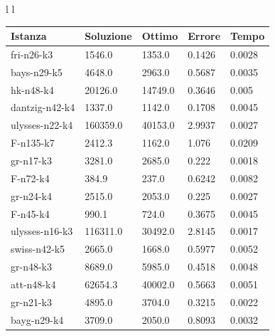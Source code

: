 \documentclass[]{article}
\begin{document}
\begin{tabular}{l l}
	\small	
	\begin{tabular}{||l | l l l l||} 
		\hline
		Istanza & Soluzione & Ottimo & Errore & Tempo \\ [0.5ex] 
		\hline\hline
		fri-n26-k3 & 1546.0 & 1353.0 & 0.1426 & 0.0028  \\
		bays-n29-k5 & 4648.0 & 2963.0 & 0.5687 & 0.0035  \\
		hk-n48-k4 & 20126.0 & 14749.0 & 0.3646 & 0.005  \\
		dantzig-n42-k4 & 1337.0 & 1142.0 & 0.1708 & 0.0045  \\
		ulysses-n22-k4 & 160359.0 & 40153.0 & 2.9937 & 0.0027  \\
		F-n135-k7 & 2412.3 & 1162.0 & 1.076 & 0.0209  \\
		gr-n17-k3 & 3281.0 & 2685.0 & 0.222 & 0.0018  \\
		F-n72-k4 & 384.9 & 237.0 & 0.6242 & 0.0082  \\
		gr-n24-k4 & 2515.0 & 2053.0 & 0.225 & 0.0027  \\
		F-n45-k4 & 990.1 & 724.0 & 0.3675 & 0.0045  \\
		ulysses-n16-k3 & 116311.0 & 30492.0 & 2.8145 & 0.0017  \\
		swiss-n42-k5 & 2665.0 & 1668.0 & 0.5977 & 0.0052  \\
		gr-n48-k3 & 8689.0 & 5985.0 & 0.4518 & 0.0048  \\
		att-n48-k4 & 62654.3 & 40002.0 & 0.5663 & 0.0051  \\
		gr-n21-k3 & 4895.0 & 3704.0 & 0.3215 & 0.0022  \\
		bayg-n29-k4 & 3709.0 & 2050.0 & 0.8093 & 0.0032  \\				
		[1ex] 
		\hline
	\end{tabular}
	

\end{tabular}
\end{document}
